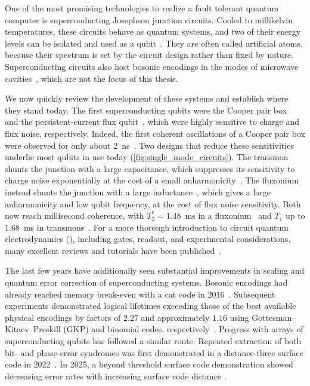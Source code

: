 One of the most promising technologies to realize a fault tolerant quantum computer is superconducting Josephson junction circuits.
Cooled to millikelvin temperatures, these circuits behave as quantum systems, and two of their energy levels can be isolated and used as a qubit~\cite{clarke2008,devoret2013}.
They are often called artificial atoms, because their spectrum is set by the circuit design rather than fixed by nature.
Superconducting circuits also host bosonic encodings in the modes of microwave cavities~\cite{joshi2021}, which are not the focus of this thesis.

We now quickly review the development of these systems and establish where they stand today.
The first superconducting qubits were the Cooper pair box~\cite{bouchiat1998,nakamura1999} and the persistent-current flux qubit~\cite{mooij1999,vanderwal2000}, which were highly sensitive to charge and flux noise, respectively.
Indeed, the first coherent oscillations of a Cooper pair box were observed for only about $2$~ns~\cite{nakamura1999}.
Two designs that reduce these sensitivities underlie most qubits in use today (\cref{fig:single_mode_circuits}).
The transmon shunts the junction with a large capacitance, which suppresses its sensitivity to charge noise exponentially at the cost of a small anharmonicity~\cite{kochChargeinsensitiveQubitDesign2007b}.
The fluxonium instead shunts the junction with a large inductance~\cite{manucharyanFluxoniumSingleCooperPair2009a}, which gives a large anharmonicity and low qubit frequency, at the cost of flux noise sensitivity.
Both now reach millisecond coherence, with $T_2^* = 1.48$~ms in a fluxonium~\cite{somoroff2023} and $T_1$ up to $1.68$~ms in transmons~\cite{bland2025}.
For a more thorough introduction to circuit quantum electrodynamics (\cqed), including gates, readout, and experimental considerations, many excellent reviews and tutorials have been published~\cite{blaisCircuitQuantumElectrodynamics2021a,krantzQuantumEngineersGuide2019a,rasmussenSuperconductingCircuitCompanionan2021a,voolIntroductionQuantumElectromagnetic2017, Wang2021}.


The last few years have additionally seen substantial improvements in scaling and quantum error correction of superconducting systems.
Bosonic encodings had already reached memory break-even with a cat code in 2016~\cite{ofek2016}.
Subsequent experiments demonstrated logical lifetimes exceeding those of the best available physical encodings by factors of $2.27$ and approximately $1.16$ using Gottesman--Kitaev--Preskill (GKP) and binomial codes, respectively~\cite{sivak2023,ni2023}.
Progress with arrays of superconducting qubits has followed a similar route.
Repeated extraction of both bit- and phase-error syndromes was first demonstrated in a distance-three surface code in 2022~\cite{krinner2022}. In 2025, a beyond threshold surface code demonstration showed decreasing error rates with increasing surface code distance \cite{google2025}.


